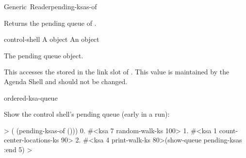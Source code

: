 \documentclass[10pt,twoside,english,pdftex]{article}
\begin{document}

\begin{functiondoc}{Generic~Reader}{pending-ksas-of}{ 
    \returns{} }
%
%

\fnsyntax

\fnpurpose Returns the pending  queue of
.

\fnmethods
{}

\fnpackage {}

\fnmodule {}

\fnargs
\begin{args}{control-shell}
 A  object
 An \textbf{} object
\end{args}

\fnreturns The pending  queue object.

\fndescription 
%
This  accesses the
 stored in the
 link slot of . This value is maintained by
the Agenda Shell and should not be changed.

\begin{alsos}{ordered-ksa-queue}
\also[ksa]
\also[on-queue-p]
\end{alsos}

\fnexample
%
%
%
%
%
Show the control shell's pending  queue (early in a
 run):
%
\W\supp
\begin{example}
  >  ( (pending-ksas-of ()))
      0. #<ksa 7 random-walk-ks 100>
      1. #<ksa 1 count-center-locations-ks 90>
      2. #<ksa 4 print-walk-ks 80>(show-queue pending-ksas :end 5)
  >
\end{example}

\end{functiondoc}
\end{document}
